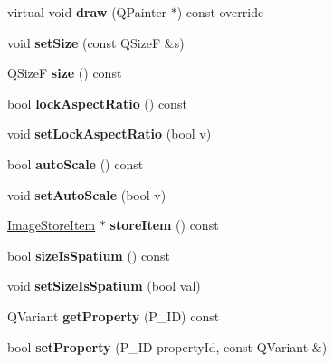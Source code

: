 \begin{DoxyCompactItemize}
virtual void {\bfseries draw} (Q\+Painter $\ast$) const override
\item 
\mbox{\label{class_ms_1_1_image_a5fc3de3460294bdb03a3e95f426f7755}} 
void {\bfseries set\+Size} (const Q\+SizeF \&s)
\item 
\mbox{\label{class_ms_1_1_image_aeeffd0c0d84df66a7d401f29be5543eb}} 
Q\+SizeF {\bfseries size} () const
\item 
\mbox{\label{class_ms_1_1_image_ac001500a669850e856fb1adabbdff10b}} 
bool {\bfseries lock\+Aspect\+Ratio} () const
\item 
\mbox{\label{class_ms_1_1_image_a99d1581cb10b028a5fd117ee223ad399}} 
void {\bfseries set\+Lock\+Aspect\+Ratio} (bool v)
\item 
\mbox{\label{class_ms_1_1_image_a8e243f49ed3516ff27175ed89c67af45}} 
bool {\bfseries auto\+Scale} () const
\item 
\mbox{\label{class_ms_1_1_image_ad7bd3884e4540ea372b35350c68f65df}} 
void {\bfseries set\+Auto\+Scale} (bool v)
\item 
\mbox{\label{class_ms_1_1_image_aa4772c90fca2f6ee116c470306e242b0}} 
\hyperlink{class_ms_1_1_image_store_item}{Image\+Store\+Item} $\ast$ {\bfseries store\+Item} () const
\item 
\mbox{\label{class_ms_1_1_image_a70313c38ffe9a9dc0893421908f84a54}} 
bool {\bfseries size\+Is\+Spatium} () const
\item 
\mbox{\label{class_ms_1_1_image_a2517282665fd70d5063b4d596fc81ccb}} 
void {\bfseries set\+Size\+Is\+Spatium} (bool val)
\item 
\mbox{\label{class_ms_1_1_image_ae91da0df874e81842b4d02edac46360b}} 
Q\+Variant {\bfseries get\+Property} (P\+\_\+\+ID) const
\item 
\mbox{\label{class_ms_1_1_image_a7889d3b7a0a8f441fdf81c03ff80b14b}} 
bool {\bfseries set\+Property} (P\+\_\+\+ID property\+Id, const Q\+Variant \&)

\end{DoxyCompactItemize}
